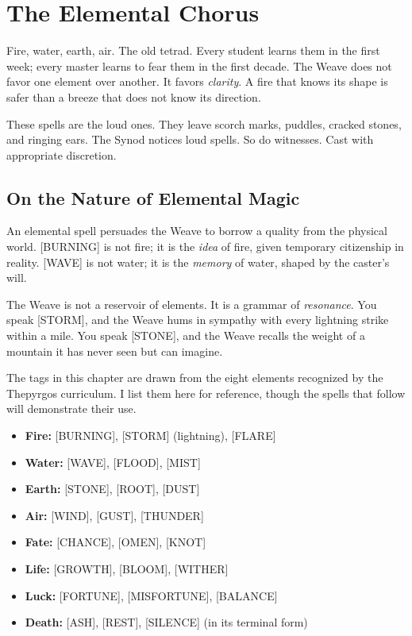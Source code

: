 \section{The Elemental Chorus}

Fire, water, earth, air. The old tetrad. Every student learns them in the first week; every master learns to fear them in the first decade. The Weave does not favor one element over another. It favors \emph{clarity}. A fire that knows its shape is safer than a breeze that does not know its direction.

These spells are the loud ones. They leave scorch marks, puddles, cracked stones, and ringing ears. The Synod notices loud spells. So do witnesses. Cast with appropriate discretion.

\subsection{On the Nature of Elemental Magic}

An elemental spell persuades the Weave to borrow a quality from the physical world. [BURNING] is not fire; it is the \emph{idea} of fire, given temporary citizenship in reality. [WAVE] is not water; it is the \emph{memory} of water, shaped by the caster's will.

The Weave is not a reservoir of elements. It is a grammar of \emph{resonance}. You speak [STORM], and the Weave hums in sympathy with every lightning strike within a mile. You speak [STONE], and the Weave recalls the weight of a mountain it has never seen but can imagine.

The tags in this chapter are drawn from the eight elements recognized by the Thepyrgos curriculum. I list them here for reference, though the spells that follow will demonstrate their use.

\begin{itemize}
    \item \textbf{Fire:} [BURNING], [STORM] (lightning), [FLARE]
    \item \textbf{Water:} [WAVE], [FLOOD], [MIST]
    \item \textbf{Earth:} [STONE], [ROOT], [DUST]
    \item \textbf{Air:} [WIND], [GUST], [THUNDER]
    \item \textbf{Fate:} [CHANCE], [OMEN], [KNOT]
    \item \textbf{Life:} [GROWTH], [BLOOM], [WITHER]
    \item \textbf{Luck:} [FORTUNE], [MISFORTUNE], [BALANCE]
    \item \textbf{Death:} [ASH], [REST], [SILENCE] (in its terminal form)
\end{itemize}

